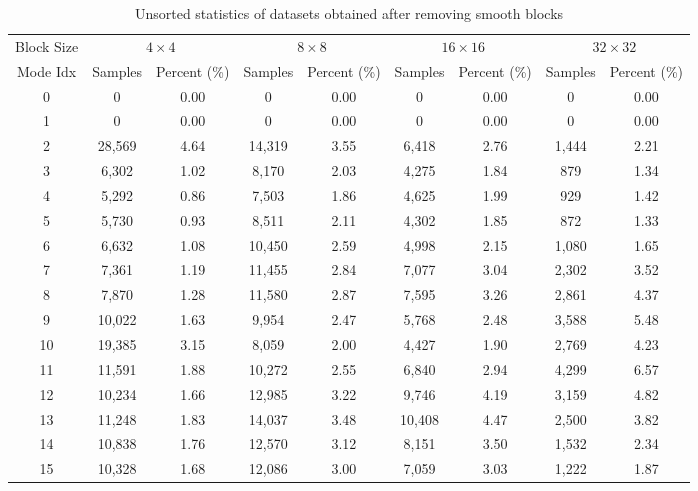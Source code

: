 \begin{table}[H]
    \caption{Unsorted statistics of datasets obtained after removing smooth blocks}
    \bigskip\label{tab:unsorted-distribution-after-third-step}
    \centering
    \resizebox{\textwidth}{!}
    {\begin{tabular}{c c c c c c c c c}
        \toprule
        Block Size & \multicolumn{2}{c}{\(4\times4\)} & \multicolumn{2}{c}{\(8\times8\)} & \multicolumn{2}{c}{\(16\times16\)} & \multicolumn{2}{c}{\(32\times32\)} \\
        Mode Idx & Samples & Percent (\%) & Samples & Percent (\%) & Samples & Percent (\%) & Samples & Percent (\%)\\
        \midrule
        0 & 0 &  0.00 & 0 &  0.00 & 0 &  0.00 & 0 &  0.00 \\ 
        1 & 0 &  0.00 & 0 &  0.00 & 0 &  0.00 & 0 &  0.00 \\ 
        2 & 28,569 &  4.64 & 14,319 &  3.55 & 6,418 &  2.76 & 1,444 &  2.21 \\ 
        3 & 6,302 &  1.02 & 8,170 &  2.03 & 4,275 &  1.84 & 879 &  1.34 \\ 
        4 & 5,292 &  0.86 & 7,503 &  1.86 & 4,625 &  1.99 & 929 &  1.42 \\ 
        5 & 5,730 &  0.93 & 8,511 &  2.11 & 4,302 &  1.85 & 872 &  1.33 \\ 
        6 & 6,632 &  1.08 & 10,450 &  2.59 & 4,998 &  2.15 & 1,080 &  1.65 \\ 
        7 & 7,361 &  1.19 & 11,455 &  2.84 & 7,077 &  3.04 & 2,302 &  3.52 \\ 
        8 & 7,870 &  1.28 & 11,580 &  2.87 & 7,595 &  3.26 & 2,861 &  4.37 \\ 
        9 & 10,022 &  1.63 & 9,954 &  2.47 & 5,768 &  2.48 & 3,588 &  5.48 \\ 
       10 & 19,385 &  3.15 & 8,059 &  2.00 & 4,427 &  1.90 & 2,769 &  4.23 \\ 
       11 & 11,591 &  1.88 & 10,272 &  2.55 & 6,840 &  2.94 & 4,299 &  6.57 \\ 
       12 & 10,234 &  1.66 & 12,985 &  3.22 & 9,746 &  4.19 & 3,159 &  4.82 \\ 
       13 & 11,248 &  1.83 & 14,037 &  3.48 & 10,408 &  4.47 & 2,500 &  3.82 \\ 
       14 & 10,838 &  1.76 & 12,570 &  3.12 & 8,151 &  3.50 & 1,532 &  2.34 \\ 
       15 & 10,328 &  1.68 & 12,086 &  3.00 & 7,059 &  3.03 & 1,222 &  1.87 \\ 

\end{tabular}}
\end{table}
